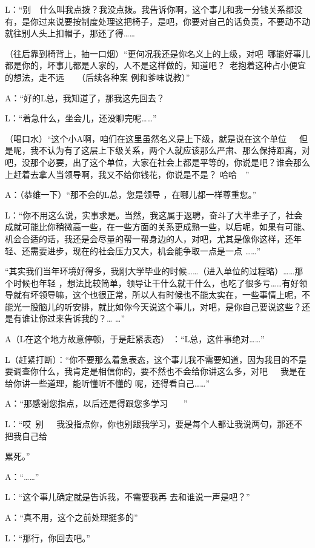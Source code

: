 \documentclass{article}
\begin{document}
L：“别~~什么叫我点拨？我没点拨。我告诉你啊，这个事儿和我一分钱关系都没有，是你过来说要按制度处理这把椅子，是吧，你要对自己的话负责，不要动不动就往别人头上扣帽子，那还了得……

（往后靠到椅背上，抽一口烟）“更何况我还是你名义上的上级，对吧~哪能好事儿都是你的，坏事儿都是人家的，人不是这样做的，知道吧？~老抱着这种占小便宜的想法，走不远~~~（后续各种案
例和爹味说教）” 

A：“好的L总，我知道了，那我这先回去？

L：“着急什么，坐会儿，还没聊完呢……”
 

\newpage

（喝口水）“这个小A啊，咱们在这里虽然名义是上下级，就是说在这个单位~~~但是呢，我不认为有了这层上下级关系，两个人就应该那么严肃、那么保持距离，对吧，没那个必要，出了这个单位，大家在社会上都是平等的，你说是吧？谁会那么上赶着去拿人当领导啊，我又不给你钱花，你说是不是？
哈哈~~” 

A：（恭维一下）“那不会的L总，您是领导
，在哪儿都一样尊重您。” 

L：“你不用这么说，实事求是。当然，我这属于返聘，奋斗了大半辈子了，社会成就可能比你稍微高一些，在一些方面的关系更成熟一些，以后呢，如果有可能、机会合适的话，我还是会尽量的帮一帮身边的人，对吧，尤其是像你这样，还年轻、还需要进步，现在的社会压力又大，机会能争取一点是一点
……” 

“其实我们当年环境好得多，我刚大学毕业的时候……（进入单位的过程略）……那个时候也年轻
\newpage
，想法比较简单，领导让干什么就干什么，也吃了很多亏……有好领导就有坏领导嘛，这个也很正常，所以人有时候也不能太实在，一些事情上呢，不能光一股脑儿的听安排，就比如你今天说这个事儿，对吧，是你自己要说这些？还是有谁让你过来告诉我的？…
…” 

A（L在这个地方故意停顿，于是赶紧表态）
：“L总，这件事绝对……” 

L（赶紧打断）：“你不要那么着急表态，这个事儿我不需要知道，因为我目的不是要调查你什么，我肯定是相信你的，要不然也不会给你讲这么多，对吧~~~我是在给你讲一些道理，能听懂听不懂的
呢，还得看自己……” 

A：“那感谢您指点，以后还是得跟您多学习
~~~” 

L：“哎~别~~~我没指点你，你也别跟我学习，要是每个人都让我说两句，那还不把我自己给
\newpage

累死。” 


A：“……” 

L：“这个事儿确定就是告诉我，不需要我再
去和谁说一声是吧？” 


A：“真不用，这个之前处理挺多的” 


L：“那行，你回去吧。” 
\end{document}
